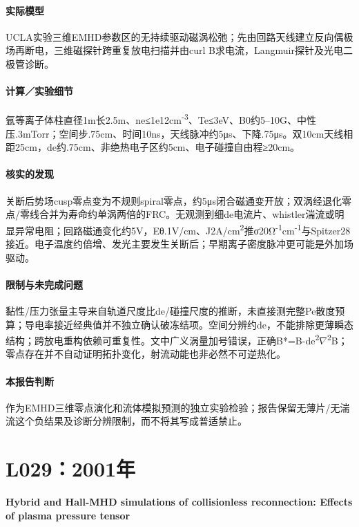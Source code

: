 \paragraph{实际模型}UCLA实验三维EMHD参数区的无持续驱动磁涡松弛；先由回路天线建立反向偶极场再断电，三维磁探针跨重复放电扫描并由curl B求电流，Langmuir探针及光电二极管诊断。

\paragraph{计算／实验细节}氩等离子体柱直径1m长2.5m、ne≤1e12cm\textsuperscript{-3}、Te≤3eV、B0约5–10G、中性压.3mTorr；空间步.75cm、时间10ns，天线脉冲约5μs、下降.75μs。双10cm天线相距25cm，de约.75cm、非绝热电子区约5cm、电子碰撞自由程≥20cm。

\paragraph{核实的发现}关断后势场cusp零点变为不规则spiral零点，约5μs闭合磁通变开放；双涡经退化零点/零线合并为寿命约单涡两倍的FRC。无观测到细de电流片、whistler湍流或明显异常电阻；回路磁通变化约5V，Eθ.1V/cm、J2A/cm\textsuperscript{2}推σ20Ω\textsuperscript{-1}cm\textsuperscript{-1}与Spitzer28接近。电子温度约倍增、发光主要发生关断后；早期离子密度脉冲更可能是外加场驱动。

\paragraph{限制与未完成问题}黏性/压力张量主导来自轨道尺度比de/碰撞尺度的推断，未直接测完整Pe散度预算；导电率接近经典值并不独立确认破冻结项。空间分辨约de，不能排除更薄瞬态结构；跨放电重构依赖可重复性。文中广义涡量加号错误，正确B*=B-de\textsuperscript{2}\ensuremath{\nabla}\textsuperscript{2}B；零点存在并不自动证明拓扑变化，射流动能也非必然不可逆热化。

\paragraph{本报告判断}作为EMHD三维零点演化和流体模拟预测的独立实验检验；报告保留无薄片/无湍流这个负结果及诊断分辨限制，而不将其写成普适禁止。

\section{L029：2001年}\label{paper:L029}

\textbf{Hybrid and Hall-MHD simulations of collisionless reconnection: Effects of plasma pressure tensor}\citep{L029}\

